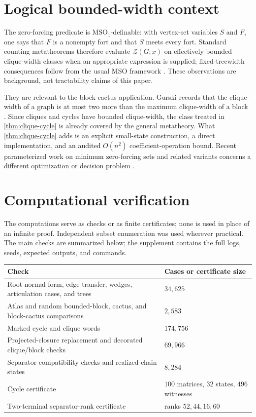 \documentclass[11pt,reqno]{amsart}
\theoremstyle{definition}
\newcommand{\Zpoly}{\mathcal Z}
\begin{document}
\section{Logical bounded-width context}\label{sec:treewidth}

The zero-forcing predicate is $\mathrm{MSO}_1$-definable: with vertex-set
variables $S$ and $F$, one says that $F$ is a nonempty fort and that $S$ meets
every fort.  Standard counting metatheorems therefore evaluate
$\Zpoly(G;x)$ on effectively bounded clique-width classes when an appropriate
expression is supplied; fixed-treewidth consequences follow from the usual
MSO framework \cite{ArnborgLagergrenSeese1991,CourcelleMakowskyRotics2001}.
These observations are background, not tractability claims of this paper.

They are relevant to the block-cactus application.  Gurski records that the
clique-width of a graph is at most two more than the maximum clique-width of a
block \cite[Sec.~3.6]{Gurski2017}.  Since cliques and cycles have bounded
clique-width, the class treated in \cref{thm:clique-cycle} is already covered
by the general metatheory.  What \cref{thm:clique-cycle} adds is an explicit
small-state construction, a direct implementation, and an audited
$O(n^2)$ coefficient-operation bound.  Recent parameterized work on minimum
zero-forcing sets and related variants concerns a different optimization or
decision problem \cite{BhyravarapuEtAl2025,GoettlicherEtAl2026}.

\section{Computational verification}\label{sec:verification}

The computations serve as checks or as finite certificates; none is used in
place of an infinite proof.  Independent subset enumeration was used wherever
practical.  The main checks are summarized below; the supplement contains the
full logs, seeds, expected outputs, and commands.

\begin{center}
\begin{tabular}{@{}p{}p{}@{}}
\toprule
Check & Cases or certificate size \\
\midrule
Root normal form, edge transfer, wedges, articulation cases, and trees
  & $34{,}625$ \\
Atlas and random bounded-block, cactus, and block-cactus comparisons
  & $2{,}583$ \\
Marked cycle and clique words
  & $174{,}756$ \\
Projected-closure replacement and decorated clique/block checks
  & $69{,}966$ \\
Separator compatibility checks and realized chain states
  & $8{,}284$ \\
Cycle certificate
  & $100$ matrices, $32$ states, $496$ witnesses \\
Two-terminal separator-rank certificate
  & ranks $52,44,16,60$ \\
\bottomrule
\end{tabular}
\end{center}
\end{document}
